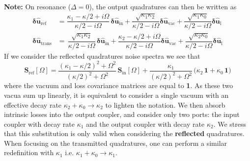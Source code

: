 \noindent \textbf{Note: } On resonance ($\Delta=0$), the output quadratures can then be written as 
\begin{equation}
  \begin{split}
  \mathbf{\delta \hat{u}_{\mathrm{ref}}}   &= \dfrac{\kappa_1-\kappa/2+i\Omega}{\kappa/2-i\Omega}  \,  \mathbf{\delta \hat{u}_{\mathrm{in}}}   +   \dfrac{\sqrt{\kappa_1 \kappa_2} }{\kappa/2-i\Omega}  \mathbf{\delta \hat{u}_{\mathrm{vac}}} + \dfrac{\sqrt{\kappa_1 \kappa_0} }{\kappa/2-i\Omega}  \mathbf{\delta \hat{u}_{\mathrm{l}}}  \\
  \mathbf{\delta \hat{u}_{\mathrm{trans}}}   &= \, \dfrac{ \sqrt{\kappa_1 \kappa_2}}{\kappa/2-i\Omega}  \, \mathbf{\delta \hat{u}_{\mathrm{in}}} +  \dfrac{\kappa_2-\kappa/2+i\Omega}{\kappa/2-i\Omega}   \mathbf{\delta \hat{u}_{\mathrm{vac}}}   + \dfrac{\sqrt{\kappa_2 \kappa_0} }{\kappa/2-i\Omega}  \mathbf{\delta \hat{u}_{\mathrm{l}}}
  \end{split}
\end{equation}
If we consider the reflected quadratures noise spectra we see that 
\begin{equation}
   \mathbf{S}_{\mathrm{ref}}[\Omega] =\frac{(\kappa_1-\kappa/2)^2+\Omega^2}{(\kappa/2)^2+\Omega^2}\,\mathbf{S}_{\mathrm{in}}[\Omega]+\frac{\kappa_1}{(\kappa/2)^2+\Omega^2}\,\Big(\kappa_2 \, \mathbf{1}+\kappa_0 \,\mathbf{1}\Big) 
\end{equation}
where the vacuum and loss covariance matrices are equal to \textbf{1}. As these two vacua sum up linearly, it is equivalent to consider a single vacuum with an effective decay rate $\kappa_2 + \kappa_0 \rightarrow \kappa_2$ to lighten the notation. We then absorb intrinsic losses into the output coupler, and consider only two ports: the input coupler with decay rate $\kappa_1$ and the output coupler with decay rate $\kappa_2$. We stress that this substitution is only valid when considering the \textbf{reflected} quadratures. When focusing on the transmitted quadratures, one can perform a similar redefinition with $\kappa_1$ i.e. $\kappa_1 + \kappa_0 \rightarrow \kappa_1$. \\


